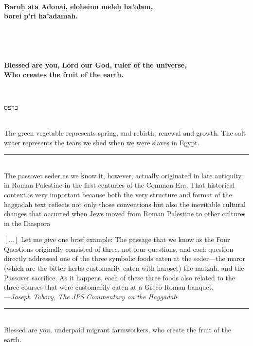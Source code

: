 \documentclass[a4paper,10pt,openany]{memoir}
\newcommand{\HgInst}[1]{{\noindent\sffamily{\bfseries{#1}}}}
\newcommand{\HgEllipsis}{\ensuremath{\left[\ldots\right]}}
\newcommand{\HgSource}[1]{\hfill{\small---\itshape{#1}}}
\newcommand{\hchapter}[1]{
  \begin{hebrew}
    \begin{Spacing}{.97}
      \newpage
      \strut

      \vspace{.15em}

      \noindent\Huge #1

      \vspace{1em}
    \end{Spacing}
  \end{hebrew}
}
\newcommand{\HgHL}[1]{{\Large\bfseries#1\par\noindent\\[-.5em]}}
\newcommand{\HgFill}{\vfill \hrule \vfill}
\newenvironment{HgEnglish}{\strut\\\noindent}{\vspace{1em}}
\newenvironment{HgTranslit}{\strut\\\noindent\begin{itshape}}{\end{itshape}\vspace{1em}}
\newcommand{\SSrc}{\textsuperscript{\upshape{[S]}}}
\begin{document}
\begin{HgTranslit}
  \HgHL{
  Baru\d{h} ata Adonai, eloheinu mele\d{h} ha'olam, \\
  borei p'ri ha'adamah.
}
\end{HgTranslit}
\vspace{-1em}
\begin{HgEnglish}
  \HgHL{
  Blessed are you, Lord our God, ruler of the universe, \\
  Who creates the fruit of the earth.
  }
\end{HgEnglish}

\HgInst{Eat the parsely.}

\vfill

\hchapter{כרפס}

\begin{HgEnglish}
The green vegetable represents spring, and rebirth, renewal and growth. The salt
water represents the tears we shed when we were slaves in Egypt.
\end{HgEnglish}

\HgFill

\begin{HgEnglish}
  The passover seder as we know it, however, actually originated in late
  antiquity, in Roman Palestine in the first centuries of the Common Era. That
  historical context is very important because both the very structure and
  format of the haggadah text reflects not only those conventions but also the
  inevitable cultural changes that occurred when Jews moved from Roman Palestine
  to other cultures in the Diaspora

  \HgEllipsis{} Let me give one brief example: The passage that we know as the
  Four Questions originally consisted of three, not four questions, and each
  question directly addressed one of the three symbolic foods eaten at the
  seder---the maror (which are the bitter herbs customarily eaten with
  \d{h}aroset) the matzah, and the Passover sacrifice. As it happens, each of
  these three foods also related to the three courses that were customarily
  eaten at a Greco-Roman banquet. \\

  \HgSource{Joseph Tabory, The JPS Commentary on the Haggadah}
\end{HgEnglish}

\HgFill

\begin{HgEnglish}
  Blessed are you, underpaid migrant farmworkers, who create the fruit of the
  earth.\SSrc
\end{HgEnglish}
\end{document}
